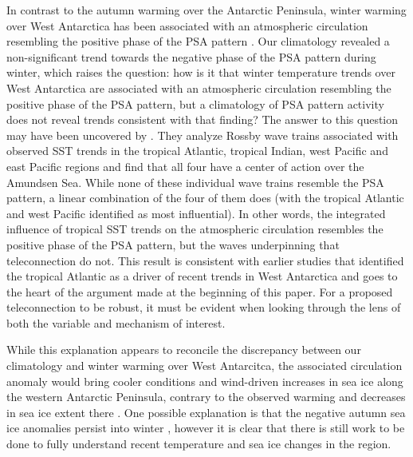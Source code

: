In contrast to the autumn warming over the Antarctic Peninsula, winter warming over West Antarctica has been associated with an atmospheric circulation resembling the positive phase of the PSA pattern \citep{Ding2011}. Our climatology revealed a non-significant trend towards the negative phase of the PSA pattern during winter, which raises the question: how is it that winter temperature trends over West Antarctica are associated with an atmospheric circulation resembling the positive phase of the PSA pattern, but a climatology of PSA pattern activity does not reveal trends consistent with that finding? The answer to this question may have been uncovered by \citet{Li2015a}. They analyze Rossby wave trains associated with observed SST trends in the tropical Atlantic, tropical Indian, west Pacific and east Pacific regions and find that all four have a center of action over the Amundsen Sea. While none of these individual wave trains resemble the PSA pattern, a linear combination of the four of them does (with the tropical Atlantic and west Pacific identified as most influential). In other words, the integrated influence of tropical SST trends on the atmospheric circulation resembles the positive phase of the PSA pattern, but the waves underpinning that teleconnection do not. This result is consistent with earlier studies that identified the tropical Atlantic as a driver of recent trends in West Antarctica \citep{Li2014,Simpkins2014} and goes to the heart of the argument made at the beginning of this paper. For a proposed teleconnection to be robust, it must be evident when looking through the lens of both the variable and mechanism of interest.

While this explanation appears to reconcile the discrepancy between our climatology and winter warming over West Antarcitca, the associated circulation anomaly would bring cooler conditions and wind-driven increases in sea ice along the western Antarctic Peninsula, contrary to the observed warming and decreases in sea ice extent there \citep{Clem2015}. One possible explanation is that the negative autumn sea ice anomalies persist into winter \citet{Ding2013}, however it is clear that there is still work to be done to fully understand recent temperature and sea ice changes in the region.

